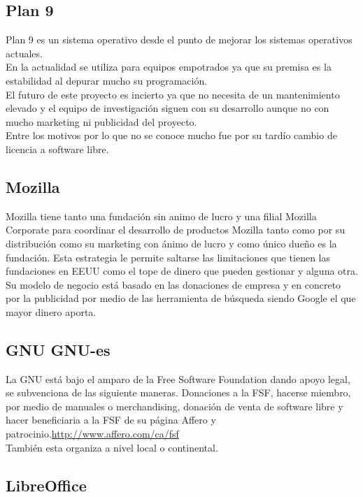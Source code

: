 \documentclass[12pt]{article} %
\begin{document}
\subsection{Plan 9} %

Plan 9 es un sistema operativo desde el punto de mejorar los sistemas operativos actuales.\\En la actualidad se utiliza para equipos empotrados ya que su premisa es la estabilidad al depurar mucho su programación.\\El futuro de este proyecto es incierto ya que no necesita de un mantenimiento elevado y el equipo de investigación siguen con su desarrollo aunque no con mucho marketing ni publicidad del proyecto.\\Entre los motivos por lo que no se conoce mucho fue por su tardío cambio de licencia a software libre. 
\subsection{Mozilla} %

Mozilla tiene tanto una fundación sin animo de lucro y una filial Mozilla Corporate para coordinar el desarrollo de productos Mozilla tanto como por su distribución como su marketing con ánimo de lucro y como único dueño es la fundación. Esta estrategia le permite saltarse las limitaciones que tienen las fundaciones en EEUU como el tope de dinero que pueden gestionar y alguna otra.\\ Su modelo de negocio está basado en las donaciones de empresa y en concreto por la publicidad por medio de las herramienta de búsqueda siendo Google el que mayor dinero aporta.
\subsection{GNU GNU-es} %
La GNU está bajo el amparo de la Free Software Foundation dando apoyo legal, se subvenciona de las siguiente maneras. Donaciones a la FSF, hacerse miembro, por medio de manuales o merchandising, donación de venta de software libre y hacer beneficiaria a la FSF de su página Affero y patrocinio.\url{http://www.affero.com/ca/fsf}\\También esta organiza a nivel local o continental.

\subsection{LibreOffice} %
\end{document}

